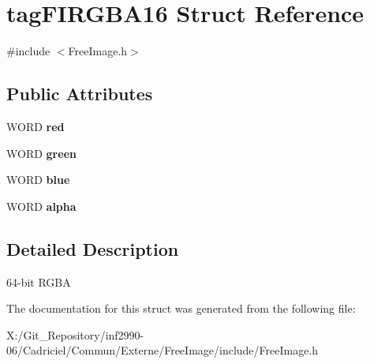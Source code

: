 \hypertarget{structtag_f_i_r_g_b_a16}{\section{tag\-F\-I\-R\-G\-B\-A16 Struct Reference}
\label{structtag_f_i_r_g_b_a16}
}


{\ttfamily \#include $<$Free\-Image.\-h$>$}

\subsection*{Public Attributes}
\begin{DoxyCompactItemize}
\item 
\hypertarget{structtag_f_i_r_g_b_a16_a580143c8b2f5e28721972342a6facd01}{W\-O\-R\-D {\bfseries red}}\label{structtag_f_i_r_g_b_a16_a580143c8b2f5e28721972342a6facd01}

\item 
\hypertarget{structtag_f_i_r_g_b_a16_a0ae72ef6b7fe786b9ea6068579cd3f2d}{W\-O\-R\-D {\bfseries green}}\label{structtag_f_i_r_g_b_a16_a0ae72ef6b7fe786b9ea6068579cd3f2d}

\item 
\hypertarget{structtag_f_i_r_g_b_a16_afe4aa863b00988ad24831a1432ef837e}{W\-O\-R\-D {\bfseries blue}}\label{structtag_f_i_r_g_b_a16_afe4aa863b00988ad24831a1432ef837e}

\item 
\hypertarget{structtag_f_i_r_g_b_a16_a9875250254b19efbfb321bf33ae2fdf6}{W\-O\-R\-D {\bfseries alpha}}\label{structtag_f_i_r_g_b_a16_a9875250254b19efbfb321bf33ae2fdf6}

\end{DoxyCompactItemize}


\subsection{Detailed Description}
64-\/bit R\-G\-B\-A 

The documentation for this struct was generated from the following file\-:\begin{DoxyCompactItemize}
\item 
X\-:/\-Git\-\_\-\-Repository/inf2990-\/06/\-Cadriciel/\-Commun/\-Externe/\-Free\-Image/include/Free\-Image.\-h\end{DoxyCompactItemize}
